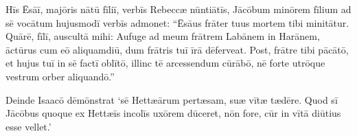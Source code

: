 \Versus Hīs Ēsāī, majōris nātū fīliī, verbīs Rebeccæ nūntiātīs, Jācōbum minōrem fīlium ad sē vocātum hujusmodī verbīs admonet: ``Ēsāus frāter tuus mortem tibi minitātur.
\Versus Quārē, fīlī, auscultā mihi: Aufuge ad meum frātrem Labānem in Harānem,
\Versus āctūrus cum eō aliquamdiū, dum frātris tuī īrā dēferveat.
\Versus Post, frātre tibi pācātō, et hujus tuī in sē factī oblītō, illinc tē arcessendum cūrābō, nē forte utrōque vestrum orber aliquandō.''

\Versus Deinde Isaacō dēmōnstrat `sē Hettæārum pertæsam, suæ vītæ tædēre. Quod sī Jācōbus quoque ex Hettæīs incolīs uxōrem dūceret, nōn fore, cūr in vītā diūtius esse vellet.'
